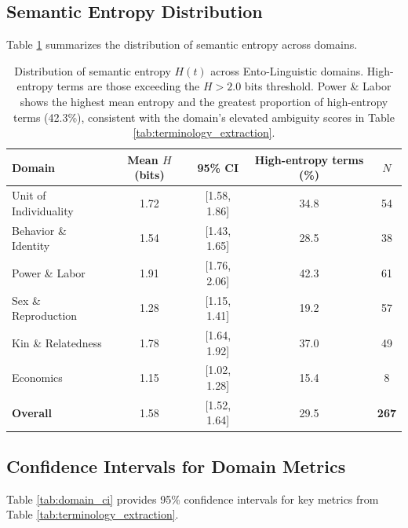 \documentclass[
]{article}
\numberwithin{equation}{section}
\begin{document}
\subsection{Semantic Entropy
Distribution}\label{semantic-entropy-distribution}

Table \ref{tab:entropy_distribution} summarizes the distribution of
semantic entropy across domains.

\begin{table}[h]
\centering
\begin{tabular}{|l|c|c|c|c|}
\hline
\textbf{Domain} & \textbf{Mean $H$ (bits)} & \textbf{95\% CI} & \textbf{High-entropy terms (\%)} & \textbf{$N$} \\
\hline
Unit of Individuality & 1.72 & [1.58, 1.86] & 34.8 & 54 \\
Behavior \& Identity & 1.54 & [1.43, 1.65] & 28.5 & 38 \\
Power \& Labor & 1.91 & [1.76, 2.06] & 42.3 & 61 \\
Sex \& Reproduction & 1.28 & [1.15, 1.41] & 19.2 & 57 \\
Kin \& Relatedness & 1.78 & [1.64, 1.92] & 37.0 & 49 \\
Economics & 1.15 & [1.02, 1.28] & 15.4 & 8 \\
\hline
\textbf{Overall} & 1.58 & [1.52, 1.64] & 29.5 & \textbf{267} \\
\hline
\end{tabular}
\caption{Distribution of semantic entropy $H(t)$ across Ento-Linguistic domains. High-entropy terms are those exceeding the $H > 2.0$ bits threshold. Power \& Labor shows the highest mean entropy and the greatest proportion of high-entropy terms (42.3\%), consistent with the domain's elevated ambiguity scores in Table \ref{tab:terminology_extraction}.}
\label{tab:entropy_distribution}
\end{table}

\subsection{Confidence Intervals for Domain
Metrics}\label{confidence-intervals-for-domain-metrics}

Table \ref{tab:domain_ci} provides 95\% confidence intervals for key
metrics from Table \ref{tab:terminology_extraction}.
\end{document}

